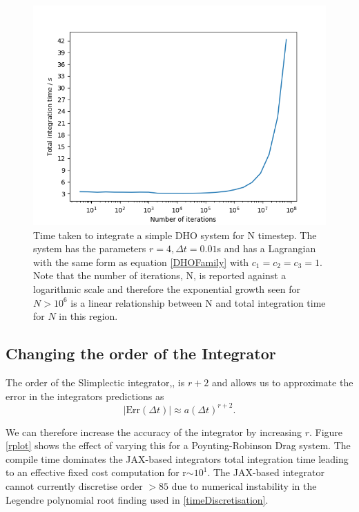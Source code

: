 \documentclass[10pt]{iopart}
\begin{document}
\begin{figure}
	\label{nplot}
	\centering
	\includegraphics[width=\columnwidth]{NPlot.jpg}
	\caption{Time taken to integrate a simple DHO system for N timestep. The system has the parameters $r=4, \Delta t=0.01$s and has a Lagrangian with the same form as equation \ref{DHOFamily} with $c_1=c_2=c_3=1$. Note that the number of iterations, N, is reported against a logarithmic scale and therefore the exponential growth seen for $N>10^6$ is a linear relationship between N and total integration time for $N$ in this region.}
\end{figure}

\subsection{Changing the order of the Integrator}
The order of the Slimplectic integrator,\cite{Tsang_Slimplectic}, is $r+2$ and allows us to approximate the error in the integrators predictions as
\begin{equation}
	|\textrm{Err}(\Delta t)| \approx a(\Delta t)^{r+2}.
\end{equation}

We can therefore increase the accuracy of the integrator by increasing $r$. Figure \ref{rplot} shows the effect of varying this for a Poynting-Robinson Drag system. The compile time dominates the JAX-based integrators total integration time leading to an effective fixed cost computation for r$\sim10^1$. The JAX-based integrator cannot currently discretise order $>85$ due to numerical instability in the Legendre polynomial root finding used in \ref{timeDiscretisation}. 
\end{document}

